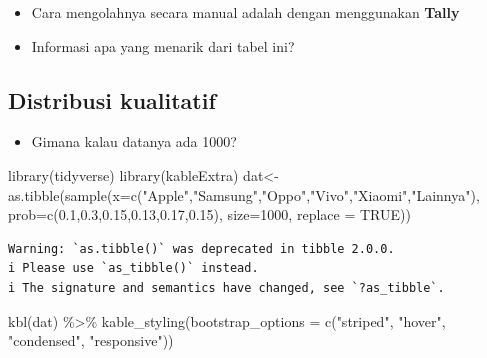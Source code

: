 \documentclass[
  letterpaper,
  DIV=11,
  numbers=noendperiod]{scrartcl}
\newenvironment{Shaded}{\begin{snugshade}}{\end{snugshade}}
\newcommand{\AttributeTok}[1]{\textcolor[rgb]{0.40,0.45,0.13}{#1}}
\newcommand{\ConstantTok}[1]{\textcolor[rgb]{0.56,0.35,0.01}{#1}}
\newcommand{\DecValTok}[1]{\textcolor[rgb]{0.68,0.00,0.00}{#1}}
\newcommand{\FloatTok}[1]{\textcolor[rgb]{0.68,0.00,0.00}{#1}}
\newcommand{\FunctionTok}[1]{\textcolor[rgb]{0.28,0.35,0.67}{#1}}
\newcommand{\NormalTok}[1]{\textcolor[rgb]{0.00,0.23,0.31}{#1}}
\newcommand{\OtherTok}[1]{\textcolor[rgb]{0.00,0.23,0.31}{#1}}
\newcommand{\SpecialCharTok}[1]{\textcolor[rgb]{0.37,0.37,0.37}{#1}}
\newcommand{\StringTok}[1]{\textcolor[rgb]{0.13,0.47,0.30}{#1}}
\providecommand{\tightlist}{%
  \setlength{\itemsep}{0pt}\setlength{\parskip}{0pt}}\usepackage{longtable,booktabs,array}
\begin{document}
\begin{itemize}
\item
  Cara mengolahnya secara manual adalah dengan menggunakan
  \textbf{Tally}
\item
  Informasi apa yang menarik dari tabel ini?
\end{itemize}

\subsection{Distribusi kualitatif}\label{distribusi-kualitatif-1}

\begin{itemize}
\tightlist
\item
  Gimana kalau datanya ada 1000?
\end{itemize}

\begin{Shaded}
\begin{Highlighting}[]
\FunctionTok{library}\NormalTok{(tidyverse)}
\FunctionTok{library}\NormalTok{(kableExtra)}
\NormalTok{dat}\OtherTok{\textless{}{-}}\FunctionTok{as.tibble}\NormalTok{(}\FunctionTok{sample}\NormalTok{(}\AttributeTok{x=}\FunctionTok{c}\NormalTok{(}\StringTok{"Apple"}\NormalTok{,}\StringTok{"Samsung"}\NormalTok{,}\StringTok{"Oppo"}\NormalTok{,}\StringTok{"Vivo"}\NormalTok{,}\StringTok{"Xiaomi"}\NormalTok{,}\StringTok{"Lainnya"}\NormalTok{),}
                      \AttributeTok{prob=}\FunctionTok{c}\NormalTok{(}\FloatTok{0.1}\NormalTok{,}\FloatTok{0.3}\NormalTok{,}\FloatTok{0.15}\NormalTok{,}\FloatTok{0.13}\NormalTok{,}\FloatTok{0.17}\NormalTok{,}\FloatTok{0.15}\NormalTok{),}
                      \AttributeTok{size=}\DecValTok{1000}\NormalTok{,}
                      \AttributeTok{replace =} \ConstantTok{TRUE}\NormalTok{))}
\end{Highlighting}
\end{Shaded}

\begin{verbatim}
Warning: `as.tibble()` was deprecated in tibble 2.0.0.
i Please use `as_tibble()` instead.
i The signature and semantics have changed, see `?as_tibble`.
\end{verbatim}

\begin{Shaded}
\begin{Highlighting}[]
\FunctionTok{kbl}\NormalTok{(dat) }\SpecialCharTok{\%\textgreater{}\%}
  \FunctionTok{kable\_styling}\NormalTok{(}\AttributeTok{bootstrap\_options =} \FunctionTok{c}\NormalTok{(}\StringTok{"striped"}\NormalTok{, }\StringTok{"hover"}\NormalTok{, }\StringTok{"condensed"}\NormalTok{, }\StringTok{"responsive"}\NormalTok{))}
\end{Highlighting}
\end{Shaded}
\end{document}
